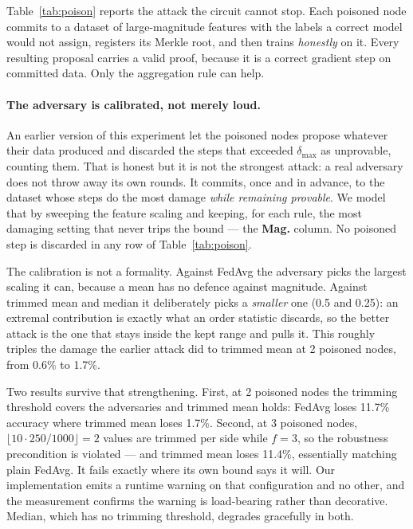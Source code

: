 \documentclass{llncs}
\begin{document}
Table~\ref{tab:poison} reports the attack the circuit cannot stop. Each poisoned
node commits to a dataset of large-magnitude features with the labels a correct
model would not assign, registers its Merkle root, and then trains \emph{honestly}
on it. Every resulting proposal carries a valid proof, because it is a correct
gradient step on committed data. Only the aggregation rule can help.

\paragraph{The adversary is calibrated, not merely loud.}
An earlier version of this experiment let the poisoned nodes propose whatever
their data produced and discarded the steps that exceeded $\delta_{\max}$ as
unprovable, counting them. That is honest but it is not the strongest attack:
a real adversary does not throw away its own rounds. It commits, once and in
advance, to the dataset whose steps do the most damage \emph{while remaining
provable}. We model that by sweeping the feature scaling and keeping, for each
rule, the most damaging setting that never trips the bound --- the \textbf{Mag.}
column. No poisoned step is discarded in any row of Table~\ref{tab:poison}.

The calibration is not a formality. Against FedAvg the adversary picks the
largest scaling it can, because a mean has no defence against magnitude. Against
trimmed mean and median it deliberately picks a \emph{smaller} one (0.5 and
0.25): an extremal contribution is exactly what an order statistic discards, so
the better attack is the one that stays inside the kept range and pulls it. This
roughly triples the damage the earlier attack did to trimmed mean at 2 poisoned
nodes, from 0.6\% to 1.7\%.

\medskip
Two results survive that strengthening. First, at 2 poisoned nodes the trimming
threshold covers the adversaries and trimmed mean holds: FedAvg loses 11.7\%
accuracy where trimmed mean loses 1.7\%. Second, at 3 poisoned nodes,
$\lfloor 10 \cdot 250/1000 \rfloor = 2$ values are trimmed per side while
$f = 3$, so the robustness precondition is violated --- and trimmed mean loses
11.4\%, essentially matching plain FedAvg. It fails exactly where its own bound
says it will. Our implementation emits a runtime warning on that configuration
and no other, and the measurement confirms the warning is load-bearing rather
than decorative. Median, which has no trimming threshold, degrades gracefully in
both.
\end{document}

